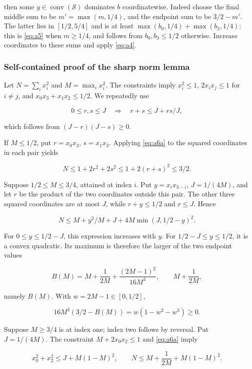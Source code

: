 then some \(y\in\operatorname{conv}(\mathcal S)\) dominates \(b\)
coordinatewise. Indeed choose the final middle sum to be
\(m'=\max(m,1/4)\), and the endpoint sum to be \(3/2-m'\). The latter lies
in \([1/2,5/4]\) and is at least
\(\max(b_0,1/4)+\max(b_3,1/4)\): this is \eqref{eq:a5} when \(m\ge1/4\), and
follows from \(b_0,b_3\le1/2\) otherwise. Increase coordinates to these sums
and apply \eqref{eq:a4}.

\subsubsection{Self-contained proof of the sharp norm lemma}

Let \(N=\sum_i x_i^2\) and \(M=\max_i x_i^2\). The constraints imply
\(x_i^2\le1\), \(2x_ix_j\le1\) for \(i\ne j\), and
\(x_0x_3+x_1x_2\le1/2\). We repeatedly use

\begin{equation}\label{eq:a6a}
0\le r,s\le J\quad\Longrightarrow\quad r+s\le J+rs/J,
\end{equation}

which follows from \((J-r)(J-s)\ge0\).

If \(M\le1/2\), put \(r=x_0x_3\), \(s=x_1x_2\). Applying \eqref{eq:a6a} to the
squared coordinates in each pair yields

\[
N\le1+2r^2+2s^2\le1+2(r+s)^2\le3/2.
\]

Suppose \(1/2\le M\le3/4\), attained at index \(i\). Put
\(y=x_ix_{3-i}\), \(J=1/(4M)\), and let \(r\) be the product of the two
coordinates outside this pair. The other three squared coordinates are at most
\(J\), while \(r+y\le1/2\) and \(r\le J\). Hence

\[
N\le M+y^2/M+J+4M\min(J,1/2-y)^2.
\]

For \(0\le y\le1/2-J\), this expression increases with \(y\). For
\(1/2-J\le y\le1/2\), it is a convex quadratic. Its maximum is therefore
the larger of the two endpoint values

\[
B(M)=M+\frac1{2M}+\frac{(2M-1)^2}{16M^3},\qquad M+\frac1{2M},
\]

namely \(B(M)\). With \(w=2M-1\in[0,1/2]\),

\[
16M^3(3/2-B(M))=w(1-w^2-w^3)\ge0.
\]

Suppose \(M\ge3/4\) is at index one; index two follows by reversal. Put
\(J=1/(4M)\). The constraint \(M+2x_0x_2\le1\) and \eqref{eq:a6a} imply

\[
x_0^2+x_2^2\le J+M(1-M)^2,
\qquad N\le M+\frac1{2M}+M(1-M)^2.
\]


